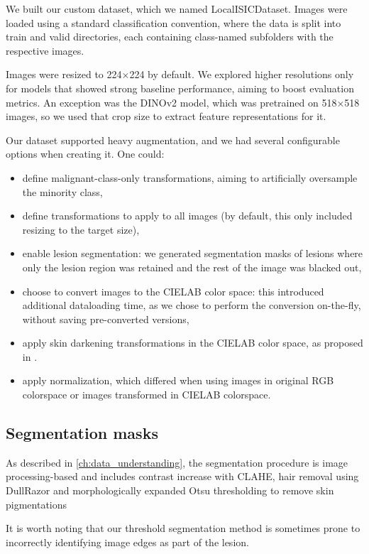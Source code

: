 We built our custom dataset, which we named LocalISICDataset. Images were loaded using a standard classification convention, where the data is split into train and valid directories, each containing class-named subfolders with the respective images.

Images were resized to 224×224 by default. We explored higher resolutions only for models that showed strong baseline performance, aiming to boost evaluation metrics. An exception was the DINOv2 model, which was pretrained on 518×518 images, so we used that crop size to extract feature representations for it.

Our dataset supported heavy augmentation, and we had several configurable options when creating it.
One could:

\begin{itemize}
    \item define malignant-class-only transformations, aiming to artificially oversample the minority class,
    \item define transformations to apply to all images (by default, this only included resizing to the target size),
    \item enable lesion segmentation: we generated segmentation masks of lesions where only the lesion region was retained and the rest of the image was blacked out,
    \item choose to convert images to the CIELAB color space: this introduced additional dataloading time, as we chose to perform the conversion on-the-fly, without saving pre-converted versions,
    \item apply skin darkening transformations in the CIELAB color space, as proposed in \cite{assessing_bias_in_classifiers}.
    \item apply normalization, which differed when using images in original RGB colorspace or images transformed in CIELAB colorspace.
\end{itemize}

\subsection{Segmentation masks}
As described in \ref{ch:data_understanding}, the segmentation procedure is image processing-based and includes contrast increase with CLAHE, hair removal using DullRazor and morphologically expanded Otsu thresholding to remove skin pigmentations

It is worth noting that our threshold segmentation method is sometimes prone to incorrectly identifying image edges as part of the lesion.

